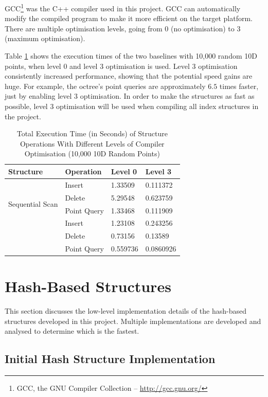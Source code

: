 GCC\footnote{GCC, the GNU Compiler Collection -- \url{http://gcc.gnu.org/}} was the C++ compiler used in this project. GCC can automatically modify the compiled program to make it more efficient on the target platform. There are multiple optimisation levels, going from 0 (no optimisation) to 3 (maximum optimisation).

Table \ref{tab:compiler-optimisation} shows the execution times of the two baselines with 10,000 random 10D points, when level 0 and level 3 optimisation is used. Level 3 optimisation consistently increased performance, showing that the potential speed gains are huge. For example, the octree's point queries are approximately $6.5$ times faster, just by enabling level 3 optimisation.  In order to make the structures as fast as possible, level 3 optimisation will be used when compiling all index structures in the project.

\begin{table}
	\centering
	\begin{tabular}{|l|l|l|l|}
		\hline
		\textbf{Structure} & \textbf{Operation} & \textbf{Level 0} & \textbf{Level 3} \\
		\hline
		\multirow{ 4}{*}{Sequential Scan} & Insert & 1.33509 & 0.111372 \\
		 & Delete & 5.29548 & 0.623759 \\
		 & Point Query & 1.33468 & 0.111909 \\
		\hline
		\multirow{ 4}{*}{Octree} & Insert & 1.23108 & 0.243256 \\
		 & Delete & 0.73156 & 0.13589 \\
		 & Point Query & 0.559736 & 0.0860926 \\
		 \hline
	\end{tabular}
	\caption{Total Execution Time (in Seconds) of Structure Operations With Different Levels of Compiler Optimisation (10,000 10D Random Points)}
	\label{tab:compiler-optimisation}
\end{table}

\section{Hash-Based Structures}
\label{sec:iteration1}

This section discusses the low-level implementation details of the hash-based structures developed in this project. Multiple implementations are developed and analysed to determine which is the fastest.

\subsection{Initial Hash Structure Implementation}

